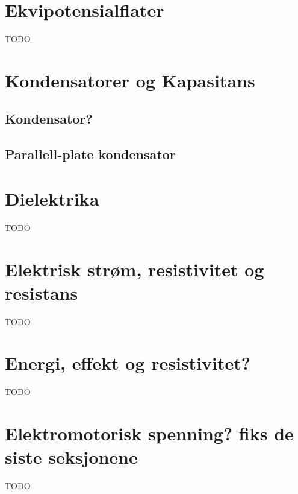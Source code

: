 \documentclass{article}
\begin{document}
  \section{Ekvipotensialflater}
    TODO
  \section{Kondensatorer og Kapasitans}
    \subsection{Kondensator?}
      
    \subsection{Parallell-plate kondensator}
      
  \section{Dielektrika}
    TODO
  \section{Elektrisk strøm, resistivitet og resistans}
    TODO
  \section{Energi, effekt og resistivitet?}
    TODO
  \section{Elektromotorisk spenning? fiks de siste seksjonene}
    TODO
\end{document}
